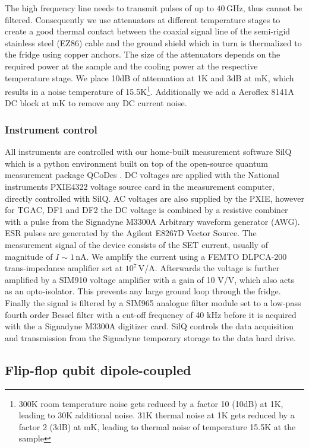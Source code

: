 The high frequency line needs to transmit pulses of up to $40\,$GHz, thus cannot be filtered. Consequently we use attenuators at different temperature stages to create a good thermal contact between the coaxial signal line of the semi-rigid stainless steel (EZ86) cable and the ground shield which in turn is thermalized to the fridge using copper anchors. The size of the attenuators depends on the required power at the sample and the cooling power at the respective temperature stage. 
We place 10dB of attenuation at 1K and 3dB at mK, which results in a noise temperature of 15.5K\footnote{300K room temperature noise gets reduced by a factor 10 (10dB) at 1K, leading to 30K additional noise. 31K thermal noise at 1K gets reduced by a factor 2 (3dB) at mK, leading to thermal noise of temperature 15.5K at the sample}. 
Additionally we add a Aeroflex 8141A DC block at mK to remove any DC current noise. 

\subsubsection{Instrument control}
All instruments are controlled with our home-built measurement software SilQ \cite{Silq} which is a python environment built on top of the open-source quantum measurement package QCoDes \cite{Qcodes}. DC voltages are applied with the National instruments PXIE4322 voltage source card in the measurement computer, directly controlled with SilQ. AC voltages are also supplied by the PXIE, however for TGAC, DF1 and DF2 the DC voltage is combined by a resistive combiner with a pulse from the Signadyne M3300A Arbitrary waveform generator (AWG). ESR pulses are generated by the Agilent E8267D Vector Source. 
The measurement signal of the device consists of the SET current, usually of magnitude of $I\sim 1\,$nA. We amplify the current using a FEMTO DLPCA-200 trans-impedance amplifier set at $10^7\,$V/A. Afterwards the voltage is further amplified by a SIM910 voltage amplifier with a gain of 10 V/V, which also acts as an opto-isolator. This prevents any large ground loop through the fridge. Finally the signal is filtered by a SIM965 analogue filter module set to a low-pass fourth order Bessel filter with a cut-off frequency of 40 kHz before it is acquired with the a Signadyne M3300A digitizer card. SilQ controls the data acquisition and transmission from the Signadyne temporary storage to the data hard drive.


\subsection{Flip-flop qubit dipole-coupled} \label{sec:setup_dd}

